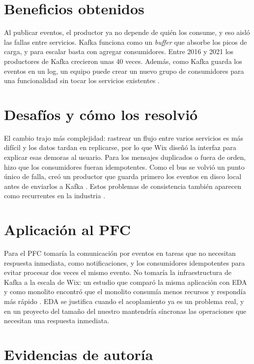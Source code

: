 \documentclass[11pt,a4paper]{article}
\begin{document}
\section*{Beneficios obtenidos}
Al publicar eventos, el productor ya no depende de quién los consume, y eso aisló las fallas entre servicios. Kafka funciona como un \textit{buffer} que absorbe los picos de carga, y para escalar basta con agregar consumidores. Entre 2016 y 2021 los productores de Kafka crecieron unas 40 veces. Además, como Kafka guarda los eventos en un log, un equipo puede crear un nuevo grupo de consumidores para una funcionalidad sin tocar los servicios existentes \cite{perez2021wix}.

\section*{Desafíos y cómo los resolvió}
El cambio trajo más complejidad: rastrear un flujo entre varios servicios es más difícil y los datos tardan en replicarse, por lo que Wix diseñó la interfaz para explicar esas demoras al usuario. Para los mensajes duplicados o fuera de orden, hizo que los consumidores fueran idempotentes. Como el bus se volvió un punto único de falla, creó un productor que guarda primero los eventos en disco local antes de enviarlos a Kafka \cite{perez2021wix}. Estos problemas de consistencia también aparecen como recurrentes en la industria \cite{laigner2021data}.

\section*{Aplicación al PFC}
Para el PFC tomaría la comunicación por eventos en tareas que no necesitan respuesta inmediata, como notificaciones, y los consumidores idempotentes para evitar procesar dos veces el mismo evento. No tomaría la infraestructura de Kafka a la escala de Wix: un estudio que comparó la misma aplicación con EDA y como monolito encontró que el monolito consumía menos recursos y respondía más rápido \cite{cabane2024impact}. EDA se justifica cuando el acoplamiento ya es un problema real, y en un proyecto del tamaño del nuestro mantendría síncronas las operaciones que necesitan una respuesta inmediata.

\newpage

\section*{Evidencias de autoría}
\end{document}

